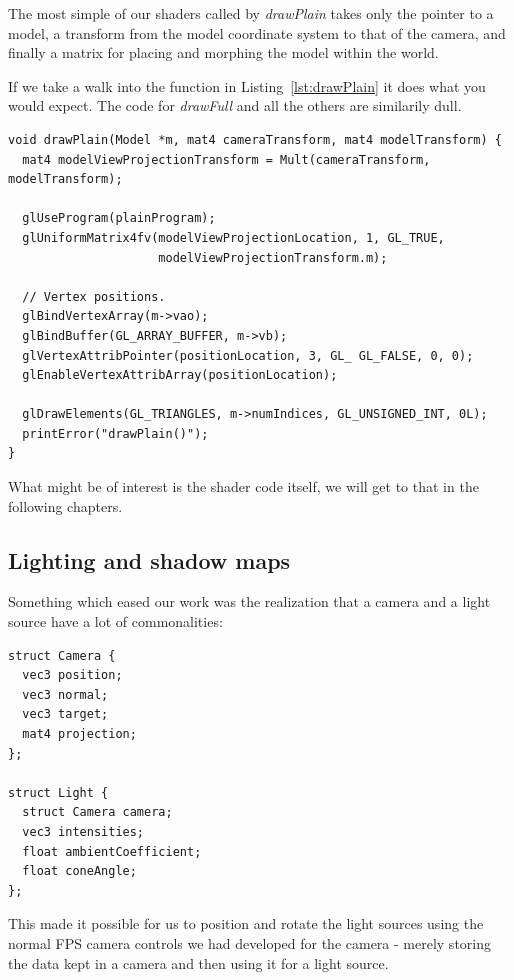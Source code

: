 \documentclass[a4paper,12pt]{article}
\begin{document}
The most simple of our shaders called by \emph{drawPlain} takes only the pointer to a model, a transform from the model coordinate system to that of the camera, and finally a matrix for placing and morphing the model within the world.

If we take a walk into the function in Listing~\ref{lst:drawPlain} it does what you would expect. The code for \emph{drawFull} and all the others are similarily dull.

\begin{lstlisting}[label=lst:drawPlain,caption= The contents of the drawPlain function.]
void drawPlain(Model *m, mat4 cameraTransform, mat4 modelTransform) {
  mat4 modelViewProjectionTransform = Mult(cameraTransform, modelTransform);

  glUseProgram(plainProgram);
  glUniformMatrix4fv(modelViewProjectionLocation, 1, GL_TRUE,
                     modelViewProjectionTransform.m);

  // Vertex positions.
  glBindVertexArray(m->vao);
  glBindBuffer(GL_ARRAY_BUFFER, m->vb);
  glVertexAttribPointer(positionLocation, 3, GL_ GL_FALSE, 0, 0);
  glEnableVertexAttribArray(positionLocation);

  glDrawElements(GL_TRIANGLES, m->numIndices, GL_UNSIGNED_INT, 0L);
  printError("drawPlain()");
}
\end{lstlisting}

What might be of interest is the shader code itself, we will get to that in the following chapters.


\subsection{Lighting and shadow maps}

Something which eased our work was the realization that a camera and a light source have a lot of commonalities:

\begin{lstlisting}[label=lst:lamp-struct,caption=Light source struct]
struct Camera {
  vec3 position;
  vec3 normal;
  vec3 target;
  mat4 projection;
};

struct Light {
  struct Camera camera;
  vec3 intensities;
  float ambientCoefficient;
  float coneAngle;
};
\end{lstlisting}

This made it possible for us to position and rotate the light sources using the normal FPS camera controls we had developed for the camera - merely storing the data kept in a camera and then using it for a light source.
\end{document}
